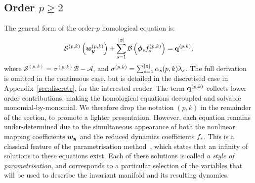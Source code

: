\documentclass[%
reprint,
superscriptaddress,
 amsmath,amssymb,
 aps,
 pre
]{revtex4-2}
\begin{document}
\subsection{Order $p \geq 2$}\label{subsec:orderp_homol}
The general form of the order-$p$ homological equation is:
\begin{equation}
\label{eq:order_p_homological_discrete}
    \mathcal{S}^{(p,k)} \left(\boldsymbol{w}_{\boldsymbol{y}}^{(p,k)}\right) + \sum_{s=1}^{|{\boldsymbol{z}}|} \mathcal{B} \left( \boldsymbol{\phi}_s f_s^{(p,k)} \right) = \mathbf{q}^{(p,k)},
\end{equation}
where $\mathcal{S}^{(p,k)}=\sigma^{(p,k)} \mathcal{B} - \mathcal{A}$, and $\sigma^{(p,k)} = \sum_{s=1}^{|{\boldsymbol{z}}|} \alpha_s(p,k) \lambda_s$. The full derivation is omitted in the continuous case, but is detailed in the discretised case in Appendix~\ref{sec:discrete}, for the interested reader.
The term $\mathbf{q}^{(p,k)}$ collects lower-order contributions, making the homological equations decoupled and solvable monomial-by-monomial. We therefore drop the notation $(p,k)$ in the remainder of the section, to promote a lighter presentation. However, each equation remains under-determined due to the simultaneous appearance of both the nonlinear mapping coefficients $\boldsymbol{w}_{\boldsymbol{y}}$ and the reduced dynamics coefficients $f_s$.
This is a classical feature of the parametrisation method~\cite{Haro}, which states that an infinity of solutions to these equations exist. Each of these solutions is called {\it a style of parametrisation}, and corresponds to a particular selection of the variables that will be used to describe the invariant manifold and its resulting dynamics.
\end{document}
